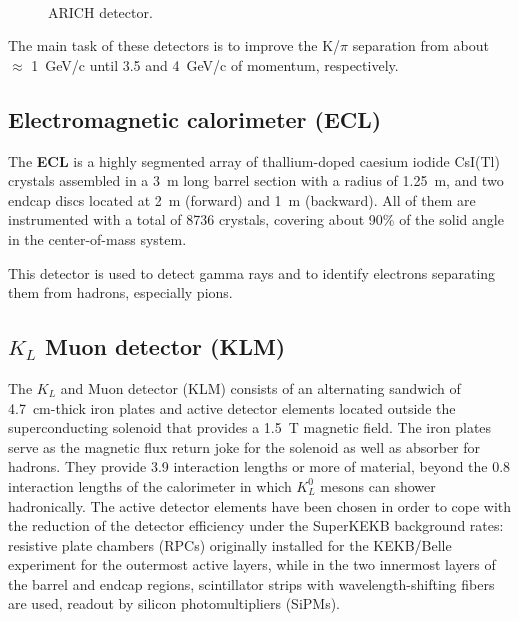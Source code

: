 \begin{figure}[h!]
\centering
{}\quad
{}\\
\caption{ARICH detector.}
\label{fig:ARICH}
\end{figure}

The main task of these detectors is to improve the K/$\pi$ separation from about $\approx$ \SI{1}{GeV/c} until 3.5 and \SI{4}{GeV/c} of momentum, respectively.

\subsection{Electromagnetic calorimeter (ECL)}

The \textbf{ECL} is a highly segmented array of thallium-doped caesium iodide CsI(Tl) crystals assembled in a \SI{3}{m} long barrel section with a radius of \SI{1.25}{m}, and two endcap discs located at \SI{2}{m} (forward) and \SI{1}{m} (backward). All of them are instrumented with a total of 8736 crystals, covering about 90\% of the solid angle in the center-of-mass system. 

This detector is used to detect gamma rays and to identify electrons separating them from hadrons, especially pions.

\subsection{$K_{L}$ Muon detector (KLM)}

The $K_{L}$ and Muon detector (KLM) consists of an alternating sandwich of \SI{4.7}{cm}-thick iron plates and active detector elements located outside the superconducting solenoid that provides a \SI{1.5}{T} magnetic field. The iron plates serve as the magnetic flux return joke for the solenoid as well as absorber for hadrons. They provide 3.9 interaction lengths or more of material, beyond the 0.8 interaction lengths of the calorimeter in which $K_{L}^{0}$ mesons can shower hadronically. The active detector elements have been chosen in order to cope with the reduction of the detector efficiency under the SuperKEKB background rates: resistive plate chambers (RPCs) originally installed for the KEKB/Belle experiment for the outermost active layers, while in the two innermost layers of the barrel and endcap regions, scintillator strips with wavelength-shifting fibers are used, readout by silicon photomultipliers (SiPMs).\\

